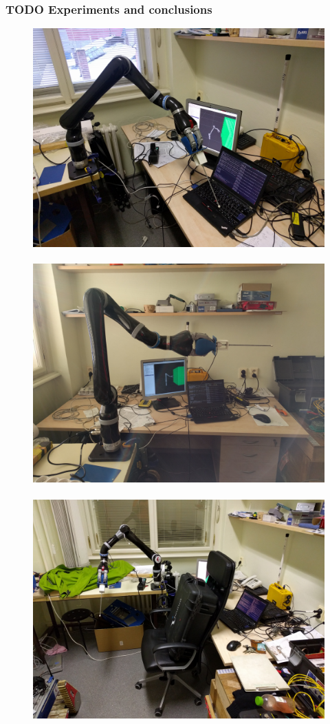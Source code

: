 \documentclass{beamer}
\begin{document}
\begin{frame}
  \frametitle{TODO Experiments and conclusions}
  \begin{figure}[ht]
    \centering
    \newlength{\fww}
    \setlength{\fww}{3.4cm}
    \includegraphics[width=\fww]{photo/exp_real_stopping.jpg}
    \,
    \includegraphics[width=\fww]{photo/exp_real_empty.jpg}
    \,
    \includegraphics[width=\fww]{photo/exp_real_chair.jpg}
  \end{figure}


\end{frame}
\end{document}
